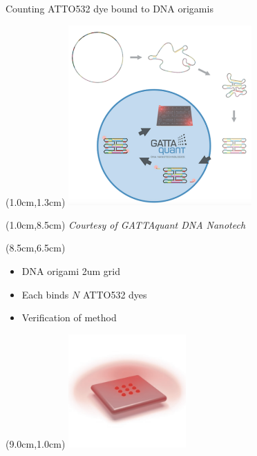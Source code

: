 \documentclass{beamer}					%
\begin{document}
\begin{frame}{Counting ATTO532 dye bound to DNA origamis}
\begin{textblock*}{7cm}(1.0cm,1.3cm)
\includegraphics[width=7cm]{../../spad/spad/media/GATTA2.png}
\end{textblock*}
\begin{textblock*}{8cm}(1.0cm,8.5cm)
\textit{Courtesy of GATTAquant DNA Nanotech}
\end{textblock*}
\begin{textblock*}{7cm}(8.5cm,6.5cm)
\begin{itemize}
\item DNA origami 2um grid
\item Each binds $N$ ATTO532 dyes
\item Verification of method
\end{itemize}
\end{textblock*}
\begin{textblock*}{4.5cm}(9.0cm,1.0cm)
\includegraphics[width=4.5cm]{../../spad/spad/media/9R.png}
\end{textblock*}
\end{frame}
\end{document}
